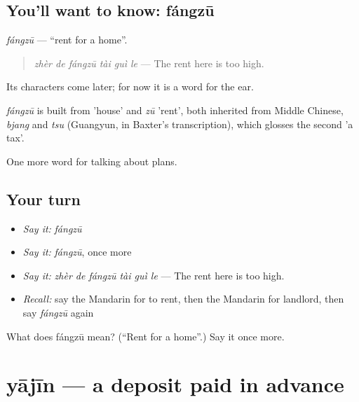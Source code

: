 \subsection*{You'll want to know: fángzū}
\emph{fángzū} — \textquotedblleft{}rent for a home\textquotedblright{}.

\begin{quote}
\emph{zhèr de fángzū tài guì le} — The rent here is too high.
\end{quote}

Its characters come later; for now it is a word for the ear.

\begin{cousinweb}
\emph{fángzū} is built from  'house' and \emph{zū} 'rent', both inherited from Middle Chinese, \emph{bjang} and \emph{tsu} (Guangyun, in Baxter's transcription), which glosses the second 'a tax'.
\end{cousinweb}

\begin{grammarlens}[title={What you've built}]
One more word for talking about plans.
\end{grammarlens}

\subsection*{Your turn}
\begin{itemize}
\raggedright
  \item \emph{Say it:} \emph{fángzū}
  \item \emph{Say it:} \emph{fángzū}, once more
  \item \emph{Say it:} \emph{zhèr de fángzū tài guì le} — The rent here is too high.
  \item \emph{Recall:} say the Mandarin for to rent, then the Mandarin for landlord, then say \emph{fángzū} again
\end{itemize}

\begin{tcolorbox}[breakable,colback=teal!4,colframe=teal!35!black,title={Before you move on}]
What does fángzū mean? (\textquotedblleft{}Rent for a home\textquotedblright{}.) Say it once more.
\end{tcolorbox}
\section[yājīn]{yājīn — a deposit paid in advance}

\label{lesson:ZH-C203-yajin}



